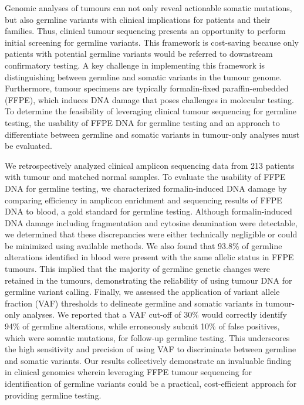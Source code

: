 Genomic analyses of tumours can not only reveal actionable somatic mutations, but also germline variants with clinical implications for patients and their families. Thus, clinical tumour sequencing presents an opportunity to perform initial screening for germline variants. This framework is cost-saving because only patients with potential germline variants would be referred to downstream confirmatory testing. A key challenge in implementing this framework is distinguishing between germline and somatic variants in the tumour genome. Furthermore, tumour specimens are typically formalin-fixed paraffin-embedded (FFPE), which induces DNA damage that poses challenges in molecular testing. To determine the feasibility of leveraging clinical tumour sequencing for germline testing, the usability of FFPE DNA for germline testing and an approach to differentiate between germline and somatic variants in tumour-only analyses must be evaluated.

We retrospectively analyzed clinical amplicon sequencing data from 213 patients with tumour and matched normal samples. To evaluate the usability of FFPE DNA for germline testing, we characterized formalin-induced DNA damage by comparing efficiency in amplicon enrichment and sequencing results of FFPE DNA to blood, a gold standard for germline testing. Although formalin-induced DNA damage including fragmentation and cytosine deamination were detectable, we determined that these discrepancies were either technically negligible or could be minimized using available methods. We also found that 93.8\% of germline alterations identified in blood were present with the same allelic status in FFPE tumours. This implied that the majority of germline genetic changes were retained in the tumours, demonstrating the reliability of using tumour DNA for germline variant calling. Finally, we assessed the application of variant allele fraction (VAF) thresholds to delineate germline and somatic variants in tumour-only analyses. We reported that a VAF cut-off of 30\% would correctly identify 94\% of germline alterations, while erroneously submit 10\% of false positives, which were somatic mutations, for follow-up germline testing. This underscores the high sensitivity and precision of using VAF to discriminate between germline and somatic variants. Our results collectively demonstrate an invaluable finding in clinical genomics wherein leveraging FFPE tumour sequencing for identification of germline variants could be a practical, cost-efficient approach for providing germline testing.

